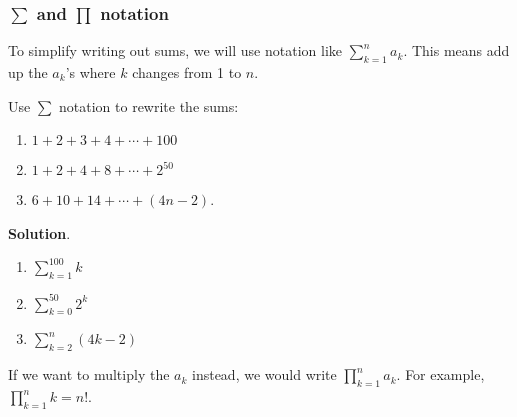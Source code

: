 \documentclass[11pt,]{book}
\theoremstyle{ptxplainnotitle}
\theoremstyle{ptxplaintitle}
\theoremstyle{ptxdefinitionnotitle}
\theoremstyle{ptxdefinitiontitle}
\theoremstyle{ptxdefinitionnotitle}
\theoremstyle{ptxdefinitiontitle}
\theoremstyle{ptxdefinitionnotitle}
\theoremstyle{ptxdefinitiontitle}
\theoremstyle{ptxdefinitiontitlenonumber}
\theoremstyle{ptxdefinitiontitlenonumber}
\numberwithin{equation}{chapter}
\renewcommand{\d}{\displaystyle}
\begin{document}
\subsubsection[{\(\sum\) and \(\prod\) notation}]{\(\sum\) and \(\prod\) notation}\label{subsubsection-3}
\hypertarget{p-220}{}%
To simplify writing out sums, we will use notation like \(\d\sum_{k=1}^n a_k\). This means add up the \(a_k\)'s where \(k\) changes from 1 to \(n\).%
\begin{example}\label{example-13}
\hypertarget{p-221}{}%
Use \(\sum\) notation to rewrite the sums:%
\par
\hypertarget{p-222}{}%
\leavevmode%
\begin{enumerate}
\item\hypertarget{li-121}{}\(1 + 2 + 3 + 4 + \cdots + 100\)%
\item\hypertarget{li-122}{}\(1 + 2 + 4 + 8 + \cdots + 2^{50}\)%
\item\hypertarget{li-123}{}\(6 + 10 + 14 + \cdots + (4n - 2)\).%
\end{enumerate}
%
\par\smallskip%
\noindent\textbf{Solution}.\hypertarget{solution-21}{}\quad%
\hypertarget{p-223}{}%
\leavevmode%
\begin{enumerate}
\item\hypertarget{li-124}{}\(\d\sum_{k=1}^{100} k\)%
\item\hypertarget{li-125}{}\(\d\sum_{k=0}^{50} 2^k\)%
\item\hypertarget{li-126}{}\(\d\sum_{k=2}^{n} (4k -2)\)%
\end{enumerate}
%
\end{example}
\hypertarget{p-224}{}%
If we want to multiply the \(a_k\) instead, we would write \(\d\prod_{k=1}^n a_k\). For example, \(\d\prod_{k=1}^n k = n!\).%
\typeout{************************************************}
\typeout{************************************************}
\end{document}
